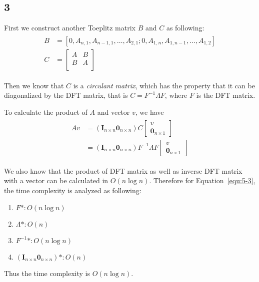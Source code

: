 \documentclass[paper=a4, fontsize=11pt]{scrartcl} %
\numberwithin{equation}{section} %
\numberwithin{figure}{section} %
\numberwithin{table}{section} %
\numberwithin{claimcounter}{section}
\begin{document}
\subsection*{3}
First we construct another Toeplitz matrix $B$ and $C$ as following:
\begin{align}
  \begin{split}
    B &= [0, A_{n, 1}, A_{n-1, 1}, \dots, A_{2, 1}; 0, A_{1, n}, A_{1, n-1},
    \dots, A_{1, 2}] \\
    C &= \begin{bmatrix}
      A & B \\
      B & A \\
    \end{bmatrix}
  \end{split}
\end{align}

Then we know that $C$ is a \textit{circulant matrix}, which has the property
that it can be diagonalized by the DFT matrix, that is $C = F^{-1}\Lambda F$,
where $F$ is the DFT matrix.

To calculate the product of $A$ and vector $v$, we have 
\begin{align}
  \begin{split}
    Av & = (\mathbf{I}_{n\times n} \mathbf{0}_{n\times n}) C \begin{bmatrix}
      v \\
      \mathbf{0}_{n \times 1}
    \end{bmatrix} \\
    &= (\mathbf{I}_{n\times n} \mathbf{0}_{n\times n}) F^{-1}\Lambda F\begin{bmatrix}
      v \\
      \mathbf{0}_{n \times 1}
    \end{bmatrix} 
  \end{split}
  \label{equ:5-3}
\end{align}

We also know that the product of DFT matrix as well as inverse DFT matrix with a vector can be calculated in 
$O(n\log n)$. Therefore for Equation~\ref{equ:5-3}, the time complexity is
analyzed as following:
\begin{enumerate}
  \item $F *: O(n\log n)$
  \item $\Lambda *: O(n) $
  \item $F^{-1} *: O(n\log n) $
  \item $(\mathbf{I}_{n\times n} \mathbf{0}_{n\times n}) * : O(n) $
\end{enumerate}
Thus the time complexity is $O(n\log n)$.
\end{document}

